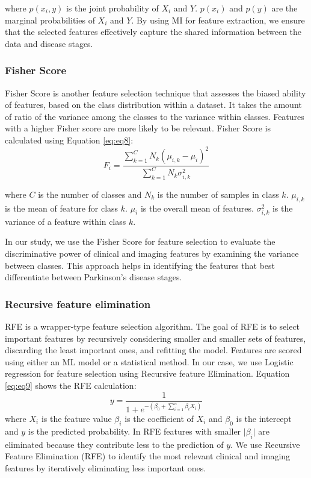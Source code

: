 \documentclass[twocolumn]{article}
\begin{document}
where $p\left(x_i,y\right)$ is the joint probability of $X_i$ and $Y$. $p\left(x_i\right)$ and $p\left(y\right)$ are the marginal probabilities of $X_i$ and $Y$. By using MI for feature extraction, we ensure that the selected features effectively capture the shared information between the data and disease stages.

\subsubsection{Fisher Score}

Fisher Score is another feature selection technique that assesses the biased ability of features, based on the class distribution within a dataset. It takes the amount of ratio of the variance among the classes to the variance within classes. Features with a higher Fisher score are more likely to be relevant. Fisher Score is calculated using Equation \eqref{eq:eq8}:
\begin{equation}
    F_i = \frac{\sum_{k=1}^{C}N_k(\mu_{i,k}-\mu_i)^2}{\sum_{k=1}^{C}N_k\sigma_{i,k}^2}
    \label{eq:eq8}
\end{equation}

where $C$ is the number of classes and $N_k$ is the number of samples in class $k$. $\mu_{i,k}$ is the mean of feature  for class $k$. $\mu_i$ is the overall mean of features. $\sigma_{i,k}^2$ is the variance of a feature within class $k$.

In our study, we use the Fisher Score for feature selection to evaluate the discriminative power of clinical and imaging features by examining the variance between classes. This approach helps in identifying the features that best differentiate between Parkinson's disease stages.

\subsubsection{Recursive feature elimination}

RFE is a wrapper-type feature selection algorithm. The goal of RFE is to select important features by recursively considering smaller and smaller sets of features, discarding the least important ones, and refitting the model. Features are scored using either an ML model or a statistical method. In our case, we use Logistic regression for feature selection using Recursive feature Elimination. Equation \eqref{eq:eq9} shows the RFE calculation:
\begin{equation}
    y = \frac{1}{1+e^{-(\beta_0 + \sum_{i=1}^n\beta_iX_i)}}
    \label{eq:eq9}
\end{equation}
where $X_i$ is the feature value $\beta_i$ is the coefficient of $X_i$ and $\beta_0$ is the intercept and $y$ is the predicted probability. In RFE features with smaller ${|\beta}_i|$ are eliminated because they contribute less to the prediction of $y$. We use Recursive Feature Elimination (RFE) to identify the most relevant clinical and imaging features by iteratively eliminating less important ones.
\end{document}
